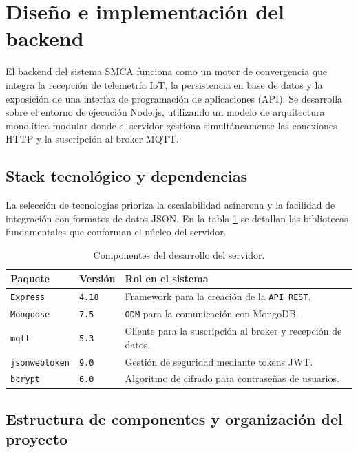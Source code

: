\section{Diseño e implementación del backend}

El backend del sistema SMCA funciona como un motor de convergencia que integra la recepción de telemetría IoT, la persistencia en base de datos y la exposición de una interfaz de programación de aplicaciones (API). Se desarrolla sobre el entorno de ejecución Node.js, utilizando un modelo de arquitectura monolítica modular donde el servidor gestiona simultáneamente las conexiones HTTP y la suscripción al broker MQTT.

\subsection{Stack tecnológico y dependencias}

La selección de tecnologías prioriza la escalabilidad asíncrona y la facilidad de integración con formatos de datos JSON. En la tabla \ref{tab:stack-backend} se detallan las bibliotecas fundamentales que conforman el núcleo del servidor.

\begin{table}[h]
    \centering
    \caption[Stack tecnológico del backend]{Componentes del desarrollo del servidor.}
    \label{tab:stack-backend}
    \begin{tabular}{p{2.8cm} p{1.5cm} p{8cm}}
        \toprule
        \textbf{Paquete} & \textbf{Versión} & \textbf{Rol en el sistema} \\
        \midrule
        \texttt{Express} & \texttt{4.18} & Framework para la creación de la \texttt{API REST}. \\
        \texttt{Mongoose} & \texttt{7.5} & \texttt{ODM} para la comunicación con MongoDB. \\
        \texttt{mqtt} & \texttt{5.3} & Cliente para la suscripción al broker y recepción de datos. \\
        \texttt{jsonwebtoken} & \texttt{9.0} & Gestión de seguridad mediante tokens JWT. \\
        \texttt{bcrypt} & \texttt{6.0} & Algoritmo de cifrado para contraseñas de usuarios. \\
        \bottomrule
    \end{tabular}
\end{table}

\subsection{Estructura de componentes y organización del proyecto}


